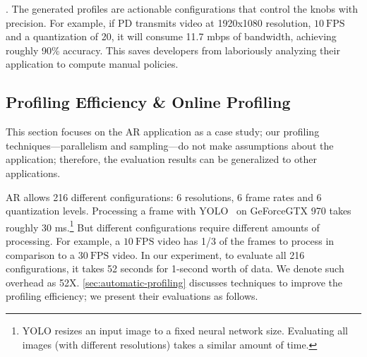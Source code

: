 . The generated profiles are actionable
configurations that control the knobs with precision. For example,
if PD transmits video at 1920x1080 resolution, \(10~\text{FPS}\) and
a quantization of 20, it will consume 11.7 mbps of bandwidth, achieving roughly
90\% accuracy. This saves developers from laboriously analyzing their
application to compute manual policies.

\subsection{Profiling Efficiency \& Online Profiling}
\label{sec:online-profiling}

This section focuses on the AR application as a case study;
our profiling techniques---parallelism and sampling---do not make assumptions about the application; therefore, the evaluation results can be generalized to other applications.

AR allows 216 different configurations: 6 resolutions, 6 frame rates and 6
quantization levels. Processing a frame with YOLO~\cite{redmon2016yolo9000} on
GeForce\textregistered\space GTX 970 takes roughly 30 ms.\footnote{YOLO resizes
  an input image to a fixed neural network size. Evaluating all images (with
  different resolutions) takes a similar amount of time.} But different
configurations require different amounts of processing. For example, a \(10~\text{FPS}\)
video has 1/3 of the frames to process in comparison to a \(30~\text{FPS}\) video.
In our experiment, to evaluate all 216 configurations, it takes 52 seconds for 1-second
worth of data. We denote such overhead as 52X\@. \autoref{sec:automatic-profiling} discusses techniques to improve the
profiling efficiency; we present their evaluations as follows.

